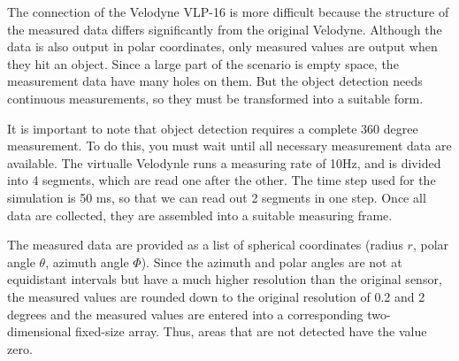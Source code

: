 \documentclass[11pt,oneside,openright]{mpreport}
\begin{document}
The connection of the Velodyne VLP-16 is more difficult because the structure of the measured data differs significantly from the original Velodyne.
Although the data is also output in polar coordinates, only measured values are output when they hit an object. Since a large part of the scenario is empty space,
the measurement data have many holes on them. But the object detection needs continuous measurements, so they must be transformed into a suitable form.

It is important to note that object detection requires a complete 360 degree measurement. To do this, you must wait until all necessary measurement data are available.
The virtualle Velodynle runs a measuring rate of 10Hz, and is divided into 4 segments, which are read one after the other. 
The time step used for the simulation is 50 ms, so that we can read out 2 segments in one step. Once all data are collected, they are assembled into a suitable measuring frame.


The measured data are provided as a list of spherical coordinates (radius $r$, polar angle $\theta $, azimuth angle $\Phi$).
Since the azimuth and polar angles are not at equidistant intervals but have a much higher resolution than the original sensor,
the measured values are rounded down to the original resolution of 0.2 and 2 degrees and the measured values are entered into a corresponding two-dimensional fixed-size array.
Thus, areas that are not detected have the value zero.
\end{document}
